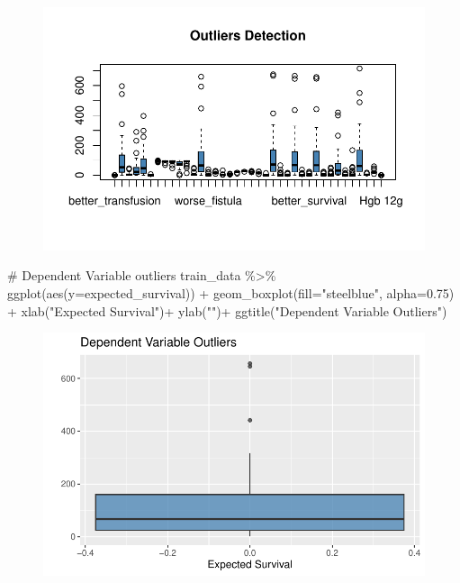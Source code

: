 \documentclass[
  letterpaper,
  DIV=11,
  numbers=noendperiod]{scrreprt}
\newenvironment{Shaded}{\begin{snugshade}}{\end{snugshade}}
\newcommand{\AttributeTok}[1]{\textcolor[rgb]{0.40,0.45,0.13}{#1}}
\newcommand{\CommentTok}[1]{\textcolor[rgb]{0.37,0.37,0.37}{#1}}
\newcommand{\FloatTok}[1]{\textcolor[rgb]{0.68,0.00,0.00}{#1}}
\newcommand{\FunctionTok}[1]{\textcolor[rgb]{0.28,0.35,0.67}{#1}}
\newcommand{\NormalTok}[1]{\textcolor[rgb]{0.00,0.23,0.31}{#1}}
\newcommand{\SpecialCharTok}[1]{\textcolor[rgb]{0.37,0.37,0.37}{#1}}
\newcommand{\StringTok}[1]{\textcolor[rgb]{0.13,0.47,0.30}{#1}}
\begin{document}
\begin{figure}[H]

{\centering \includegraphics{analysis_files/figure-pdf/unnamed-chunk-9-1.pdf}

}

\end{figure}

\begin{Shaded}
\begin{Highlighting}[]
\CommentTok{\# Dependent Variable outliers}
\NormalTok{train\_data }\SpecialCharTok{\%\textgreater{}\%} 
  \FunctionTok{ggplot}\NormalTok{(}\FunctionTok{aes}\NormalTok{(}\AttributeTok{y=}\NormalTok{expected\_survival)) }\SpecialCharTok{+}
  \FunctionTok{geom\_boxplot}\NormalTok{(}\AttributeTok{fill=}\StringTok{"steelblue"}\NormalTok{, }\AttributeTok{alpha=}\FloatTok{0.75}\NormalTok{) }\SpecialCharTok{+} 
  \FunctionTok{xlab}\NormalTok{(}\StringTok{"Expected Survival"}\NormalTok{)}\SpecialCharTok{+}
  \FunctionTok{ylab}\NormalTok{(}\StringTok{""}\NormalTok{)}\SpecialCharTok{+}
  \FunctionTok{ggtitle}\NormalTok{(}\StringTok{"Dependent Variable Outliers"}\NormalTok{)}
\end{Highlighting}
\end{Shaded}

\begin{figure}[H]

{\centering \includegraphics{analysis_files/figure-pdf/unnamed-chunk-10-1.pdf}

}

\end{figure}
\end{document}
